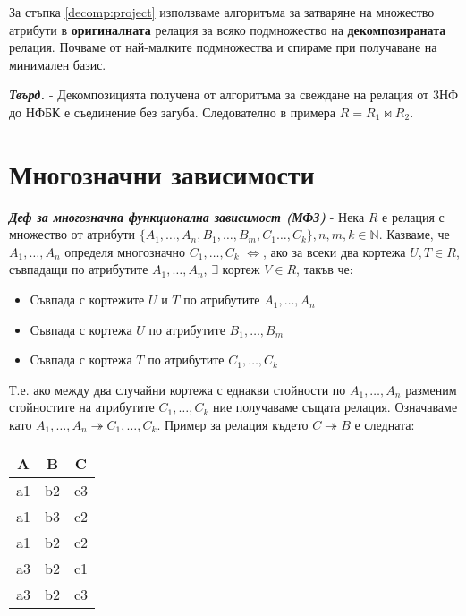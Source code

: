 \documentclass[fleqn,12pt]{article}
\begin{document}
За стъпка \ref{decomp:project} използваме алгоритъма за затваряне на множество атрибути в \textbf{оригиналната} релация за всяко подмножество 
на \textbf{декомпозираната} релация. Почваме от най-малките подмножества и спираме при получаване на минимален базис.

\textbf{\textit{Твърд.}} - Декомпозицията получена от алгоритъма за свеждане на релация от 3НФ до НФБК е съединение без загуба.
Следователно в примера $R = R_1 \bowtie R_2$.

\section{Многозначни зависимости}

\textbf{\textit{Деф за многозначна функционална зависимост (МФЗ)}} - Нека $R$ е релация с множество от атрибути $\{A_1, \dots, A_n, B_1, \dots, B_m, C_1 \dots, C_k\}, n, m, k \in \mathbb{N}$.
Казваме, че $A_1, \dots, A_n$ определя многозначно $C_1, \dots, C_k$ $\iff$, ако за всеки два кортежа $U, T \in R$, съвпадащи по атрибутите $A_1, \dots, A_n$, $\exists$ кортеж $V \in R$, такъв че:
\begin{itemize}
    \item Съвпада с кортежите $U$ и $T$ по атрибутите $A_1, \dots, A_n$
    \item Съвпада с кортежа $U$ по атрибутите $B_1, \dots, B_m$
    \item Съвпада с кортежа $T$ по атрибутите $C_1, \dots, C_k$
\end{itemize}

Т.е. ако между два случайни кортежа с еднакви стойности по $A_1, \dots, A_n$ разменим стойностите на атрибутите $C_1, \dots, C_k$ ние получаваме същата релация.
Означаваме като $A_1, \dots, A_n \twoheadrightarrow C_1, \dots, C_k$.
\bigbreak
Пример за релация където $C \twoheadrightarrow B$ е следната:

\begin{center}
\begin{tabular}{ |c|c|c| } 
    \hline
    A & B & C \\
    \hline
    a1 & b2 & c3 \\ 
    a1 & b3 & c2 \\ 
    a1 & b2 & c2 \\ 
    a3 & b2 & c1 \\
    a3 & b2 & c3 \\
    \hline
\end{tabular}
\end{center}
\end{document}

